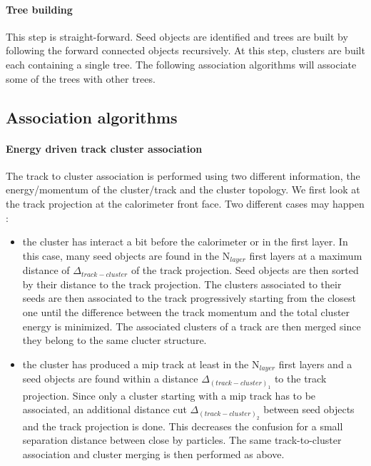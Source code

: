 \documentclass[cits]{JINST}
\begin{document}
\paragraph*{Tree building} This step is straight-forward. Seed objects are identified and trees are built by following the forward connected objects recursively. At this step, clusters are built each containing a single tree. The following association algorithms will associate some of the trees with other trees.

\subsection{Association algorithms} 


\paragraph*{Energy driven track cluster association} The track to cluster association is performed using two different information, the energy/momentum of the cluster/track and the cluster topology. We first look at the track projection at the calorimeter front face. Two different cases may happen :

\begin{itemize}
  \item the cluster has interact a bit before the calorimeter or in the first layer. In this case, many seed objects are found in the N$_{layer}$ first layers at a maximum distance of $\Delta_{track-cluster}$ of the track projection. Seed objects are then sorted by their distance to the track projection. The clusters associated to their seeds are then associated to the track progressively starting from the closest one until the difference between the track momentum and the total cluster energy is minimized. The associated clusters of a track are then merged since they belong to the same clucter structure.
  \item the cluster has produced a mip track at least in the N$_{layer}$ first layers and a seed objects are found within a distance $\Delta_{(track-cluster)_1}$ to the track projection. Since only a cluster starting with a mip track has to be associated, an additional distance cut $\Delta_{(track-cluster)_2}$ between seed objects and the track projection is done. This decreases the confusion for a small separation distance between close by particles. The same track-to-cluster association and cluster merging is then performed as above.
\end{itemize}
\end{document}
